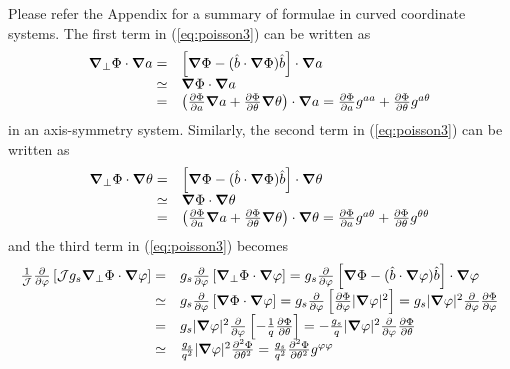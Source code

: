 \documentclass{report}
\newcommand{\bm}[1]{\mbox{\boldmath $#1$}}
\newcommand{\ff}[2]{\frac{#1}{#2}}
\newcommand{\pp}[2]{\frac{\partial{#1}}{\partial{#2}}}
\newcommand{\psp}[2]{\frac{\partial^2{#1}}{\partial{#2}^2}}
\begin{document}
Please refer the Appendix for a summary of formulae in curved coordinate systems.
The first term in (\ref{eq:poisson3}) can be written as
\begin{equation}
\label{eq:poisson4}
\begin{array} {rl}
\bm{\nabla}_\perp \Phi \cdot \bm{\nabla} a
= &
 \left[
 \bm{\nabla} \Phi - (\hat{b} \cdot \bm{\nabla} \Phi) \hat{b} 
 \right] \cdot \bm{\nabla} a
\\
\simeq &
  \bm{\nabla} \Phi \cdot \bm{\nabla} a
\\
= &
 \left(
 \pp{\Phi}{a} \bm{\nabla} a + \pp{\Phi}{\theta} \bm{\nabla} \theta
 \right) \cdot \bm{\nabla} a
=
 \pp{\Phi}{a} g^{a a} + \pp{\Phi}{\theta} g^{a \theta}
\end{array}
\end{equation}
in an axis-symmetry system.
Similarly, the second term in (\ref{eq:poisson3}) can be written as
\begin{equation}
\label{eq:poisson5}
\begin{array} {rl}
\bm{\nabla}_\perp \Phi \cdot \bm{\nabla} \theta
= &
 \left[
 \bm{\nabla} \Phi - (\hat{b} \cdot \bm{\nabla} \Phi) \hat{b} 
 \right] \cdot \bm{\nabla} \theta
\\
\simeq &
  \bm{\nabla} \Phi \cdot \bm{\nabla} \theta
\\
= &
 \left(
 \pp{\Phi}{a} \bm{\nabla} a + \pp{\Phi}{\theta} \bm{\nabla} \theta
 \right) \cdot \bm{\nabla} \theta
=
 \pp{\Phi}{a} g^{a \theta} + \pp{\Phi}{\theta} g^{\theta \theta}
\end{array}
\end{equation}
and the third term in (\ref{eq:poisson3}) becomes
\begin{equation}
\label{eq:poisson6}
\begin{array}{rl}
\ff{1}{\cal J} \pp{}{\varphi} \left[ {\cal J} g_s \bm{\nabla}_\perp \Phi \cdot \bm{\nabla} \varphi \right]
= & g_s \pp{}{\varphi} \left[ \bm{\nabla}_\perp \Phi \cdot \bm{\nabla} \varphi \right]
=  g_s \pp{}{\varphi} \left[ 
   \bm{\nabla} \Phi - (\hat{b} \cdot \bm{\nabla} \varphi ) \hat{b}
                     \right] \cdot \bm{\nabla} \varphi 
\\
\simeq & g_s \pp{}{\varphi} \left[ 
   \bm{\nabla} \Phi \cdot \bm{\nabla} \varphi 
                     \right]
=  g_s \pp{}{\varphi} \left[ 
   \pp{\Phi}{\varphi} |\bm{\nabla} \varphi |^2
                     \right]
=  g_s |\bm{\nabla} \varphi |^2 \pp{}{\varphi} \pp{\Phi}{\varphi}
\\
= & g_s |\bm{\nabla} \varphi |^2 \pp{}{\varphi} \left[ 
   -\ff{1}{q} \pp{\Phi}{\theta}
                     \right]
=  -\ff{g_s}{q} |\bm{\nabla} \varphi |^2 \pp{}{\varphi} \pp{\Phi}{\theta}
\\
\simeq & \ff{g_s}{q^2} |\bm{\nabla} \varphi |^2 \psp{\Phi}{\theta}
=  \ff{g_s}{q^2} \psp{\Phi}{\theta} g^{\varphi \varphi}
\end{array}
\end{equation}
\end{document}
